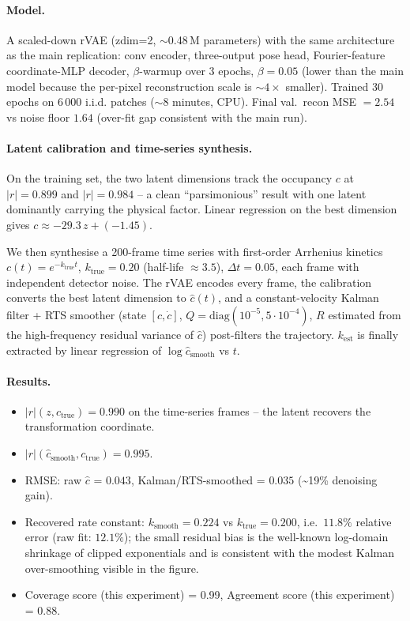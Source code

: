 \documentclass[11pt]{article}
\begin{document}
\paragraph{Model.}
A scaled-down rVAE (zdim=2, $\sim$0.48\,M parameters) with the same
architecture as the main replication: conv encoder, three-output pose head,
Fourier-feature coordinate-MLP decoder, $\beta$-warmup over 3 epochs,
$\beta=0.05$ (lower than the main model because the per-pixel reconstruction
scale is $\sim 4\times$ smaller). Trained 30 epochs on 6\,000 i.i.d. patches
($\sim$8 minutes, CPU). Final val.\ recon MSE $=2.54$ vs noise floor $1.64$
(over-fit gap consistent with the main run).

\paragraph{Latent calibration and time-series synthesis.}
On the training set, the two latent dimensions track the occupancy $c$ at
$|r|=0.899$ and $|r|=0.984$ -- a clean ``parsimonious'' result with one
latent dominantly carrying the physical factor.  Linear regression on the
best dimension gives $c \approx -29.3\,z + (-1.45)$.

We then synthesise a 200-frame time series with first-order Arrhenius
kinetics $c(t) = e^{-k_{\text{true}}t}$, $k_{\text{true}}=0.20$ (half-life
$\approx 3.5$), $\Delta t = 0.05$, each frame with independent detector noise.
The rVAE encodes every frame, the calibration converts the best latent
dimension to $\hat c(t)$, and a constant-velocity Kalman filter + RTS smoother
(state $[c, \dot c]$, $Q = \mathrm{diag}(10^{-5}, 5\!\cdot\!10^{-4})$, $R$
estimated from the high-frequency residual variance of $\hat c$) post-filters
the trajectory.  $k_{\text{est}}$ is finally extracted by linear regression
of $\log \hat c_{\text{smooth}}$ vs $t$.

\paragraph{Results.}
\begin{itemize}
\item $|r|(z, c_{\text{true}}) = 0.990$ on the time-series frames -- the
      latent recovers the transformation coordinate.
\item $|r|(\hat c_{\text{smooth}}, c_{\text{true}}) = 0.995$.
\item RMSE: raw $\hat c$ = $0.043$, Kalman/RTS-smoothed = $0.035$
      (\textasciitilde{}19\% denoising gain).
\item Recovered rate constant: $k_{\text{smooth}} = 0.224$ vs
      $k_{\text{true}} = 0.200$, i.e.\ $11.8\%$ relative error
      (raw fit: $12.1\%$); the small residual bias is the well-known
      log-domain shrinkage of clipped exponentials and is consistent with
      the modest Kalman over-smoothing visible in the figure.
\item Coverage score (this experiment) = 0.99,
      Agreement score (this experiment) = 0.88.
\end{itemize}
\end{document}
